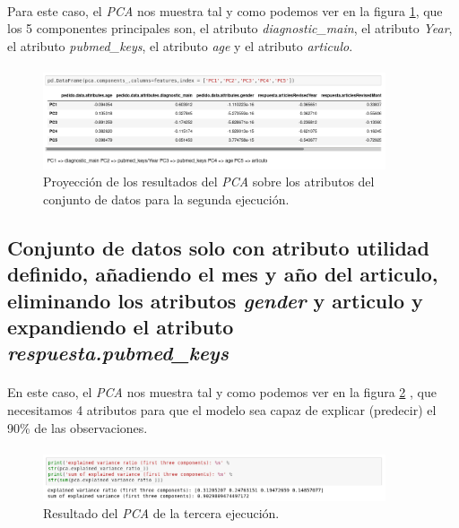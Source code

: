 \paragraph{}
Para este caso, el \textit{PCA} nos muestra tal y como podemos ver en la figura \ref{pcaTwoAtributos}, que los 5 componentes principales son, el atributo \textit{diagnostic\_main}, el atributo \textit{Year}, el atributo \textit{pubmed\_keys}, el atributo \textit{age} y el atributo \textit{articulo}.

\paragraph{}
\begin{figure}[!htb]
  \centering
    \includegraphics[width=0.9\textwidth]{images/resultados_procesado_de_datos_pca2_atributos.png}
    \caption{Proyección de los resultados del \textit{PCA} sobre los atributos del conjunto de datos para la segunda ejecución.}
  \label{pcaTwoAtributos}
\end{figure}

\subsection{Conjunto de datos solo con atributo utilidad definido, añadiendo el mes y año del articulo, eliminando los atributos \textit{gender} y articulo y expandiendo el atributo \textit{respuesta.pubmed\_keys}}

\paragraph{}
En este caso, el \textit{PCA} nos muestra tal y como podemos ver en la figura \ref{pcaThreeResult} , que necesitamos 4 atributos para que el modelo sea capaz de explicar (predecir) el 90\% de las observaciones.

\paragraph{}
\begin{figure}[!htb]
  \centering
    \includegraphics[width=0.9\textwidth]{images/resultados_procesado_de_datos_pca3_result.png}
    \caption{Resultado del \textit{PCA} de la tercera ejecución.}
  \label{pcaThreeResult}
\end{figure}

